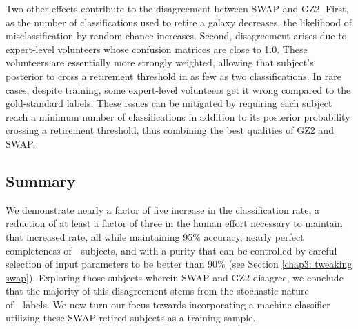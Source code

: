 Two other effects contribute to the disagreement between SWAP and GZ2. First, as the number of classifications used to retire a galaxy decreases, the likelihood of misclassification by random chance increases. Second, disagreement arises due to expert-level volunteers whose confusion matrices are close to 1.0. These volunteers are essentially more strongly weighted, allowing that subject's posterior to cross a retirement threshold in as few as two classifications. In rare cases, despite training, some expert-level volunteers get it wrong compared to the gold-standard labels. These issues can be mitigated by requiring each subject reach a minimum number of classifications in addition to its posterior probability crossing a retirement threshold, thus combining the best qualities of GZ2 and SWAP. 


\subsection{Summary}



We demonstrate nearly a factor of five increase in the classification rate, a reduction of at least a factor of three in the human effort necessary to maintain that increased rate, all while maintaining 95\% accuracy, nearly perfect completeness of~\feat~subjects, and with a purity that can be controlled by careful selection of input parameters to be better than 90\% (see Section \ref{chap3: tweaking swap}). Exploring those subjects wherein SWAP and GZ2 disagree, we conclude that the majority of this disagreement stems from the stochastic nature of~\raw~labels. We now turn our focus towards incorporating a machine classifier utilizing these SWAP-retired subjects as a training sample. 



